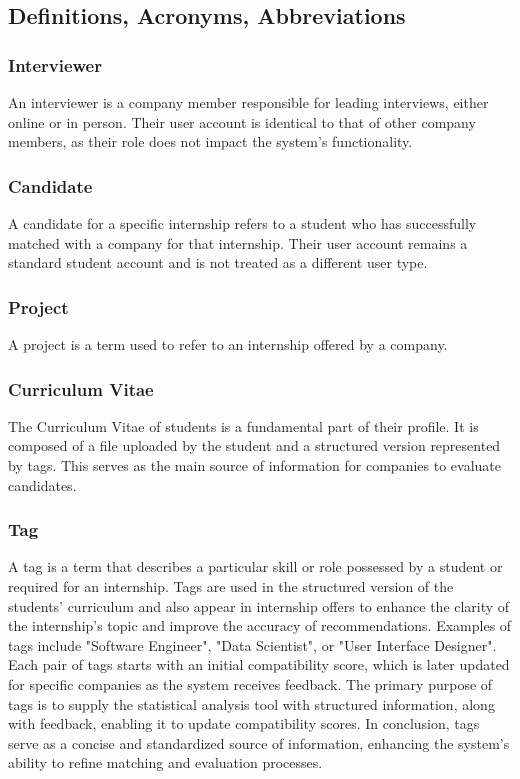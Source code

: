 \subsection{Definitions, Acronyms, Abbreviations}
\label{sec:def}

\subsubsection{Interviewer}

An interviewer is a company member responsible for leading interviews, either online or in person. Their user account is identical to that of other company members,
 as their role does not impact the system's functionality.

\subsubsection{Candidate}

A candidate for a specific internship refers to a student who has successfully matched with a company for that internship. Their user account remains a standard student 
account and is not treated as a different user type.

\subsubsection{Project}

A project is a term used to refer to an internship offered by a company.

\subsubsection{Curriculum Vitae}

The Curriculum Vitae of students is a fundamental part of their profile. It is composed of a file uploaded by the student and a structured version represented by tags. 
This serves as the main source of information for companies to evaluate candidates.

\subsubsection{Tag}

A tag is a term that describes a particular skill or role possessed by a student or required for an internship. Tags are used in the structured version of the students' 
curriculum and also appear in internship offers to enhance the clarity of the internship's topic and improve the accuracy of recommendations. Examples of tags include 
"Software Engineer", "Data Scientist", or "User Interface Designer". Each pair of tags starts with an initial compatibility score, which is later updated for specific 
companies as the system receives feedback. The primary purpose of tags is to supply the statistical analysis tool with structured information, along with feedback, 
enabling it to update compatibility scores. In conclusion, tags serve as a concise and standardized source of information, enhancing the system's ability to refine 
matching and evaluation processes.

